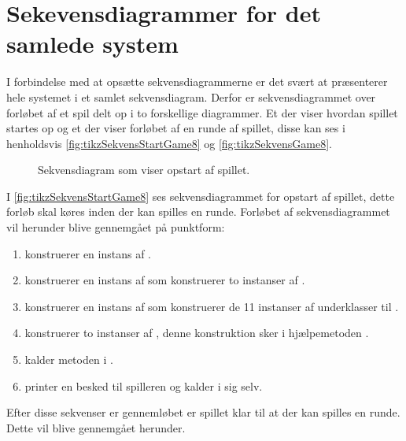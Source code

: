 \section{Sekevensdiagrammer for det samlede system}
I forbindelse med at opsætte sekvensdiagrammerne er det svært at præsenterer hele systemet i et samlet sekvensdiagram. Derfor er sekvensdiagrammet over forløbet af et spil delt op i to forskellige diagrammer. Et der viser hvordan spillet startes op og et der viser forløbet af en runde af spillet, disse kan ses i henholdsvis \vref{fig:tikzSekvensStartGame8} og \vref{fig:tikzSekvensGame8}.

\begin{figure}
\caption{Sekvensdiagram som viser opstart af spillet.}\label{fig:tikzSekvensStartGame8}
\centering

\end{figure}

I \vref{fig:tikzSekvensStartGame8} ses sekvensdiagrammet for opstart af spillet, dette forløb skal køres inden der kan spilles en runde. Forløbet af sekvensdiagrammet vil herunder blive gennemgået på punktform:
\begin{enumerate}
\item {} konstruerer en instans af .
\item {} konstruerer en instans af  som konstruerer to instanser af .
\item {} konstruerer en instans af  som konstruerer de 11 instanser af underklasser til .
\item {} konstruerer to instanser af , denne konstruktion sker i hjælpemetoden .
\item {} kalder metoden  i .
\item {} printer en besked til spilleren og kalder  i sig selv.
\end{enumerate}

Efter disse sekvenser er gennemløbet er spillet klar til at der kan spilles en runde. Dette vil blive gennemgået herunder.

